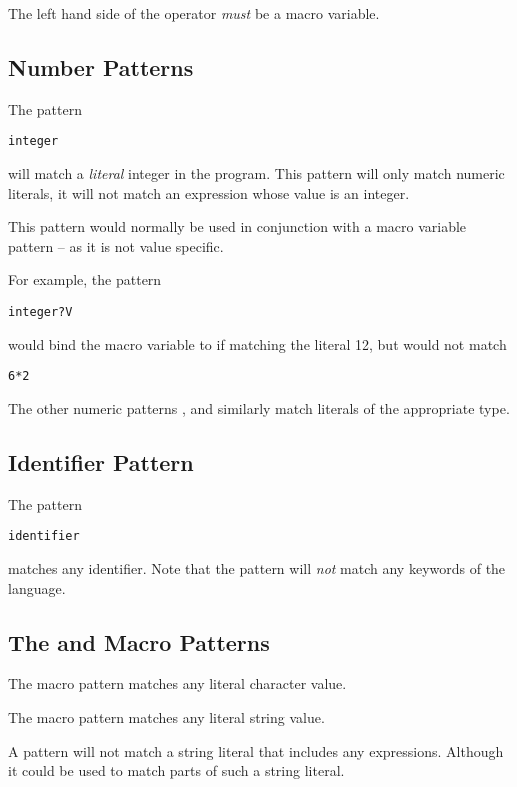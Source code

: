 \begin{aside}
The left hand side of the  operator \emph{must} be a macro variable.
\end{aside}

\subsection{Number Patterns}
The pattern 
\begin{alltt}
integer
\end{alltt}
will match a \emph{literal} integer in the program.
This pattern will only match numeric literals, it will not match an expression whose value is an integer.
\begin{aside}
This pattern would normally be used in conjunction with a macro variable pattern -- as it is not value specific.
\end{aside}
For example, the pattern
\begin{alltt}
integer?V
\end{alltt}
would bind the macro variable  to  if matching the literal 12, but would not match
\begin{alltt}
6*2
\end{alltt}
The other numeric patterns ,  and  similarly match literals of the appropriate type.

\subsection{Identifier Pattern}
The pattern
\begin{alltt}
identifier
\end{alltt}
matches any identifier. Note that the  pattern will \emph{not} match any keywords of the language.

\subsection{The  and  Macro Patterns}
The  macro pattern matches any literal character value.

The  macro pattern matches any literal string value.
\begin{aside}
A  pattern will not match a string literal that includes any  expressions. Although it could be used to match parts of such a string literal.
\end{aside}


